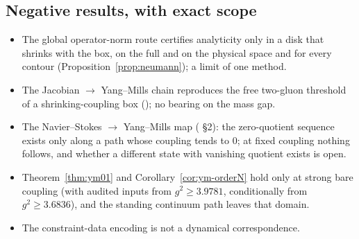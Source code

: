\subsection{Negative results, with exact scope}

\begin{itemize}
\item The global operator-norm route certifies analyticity only in a disk that shrinks with the box, on the full and on the physical space and for every contour (Proposition~\ref{prop:neumann}); a limit of one method.
\item The Jacobian $\to$ Yang--Mills chain reproduces the free two-gluon threshold of a shrinking-coupling box (); no bearing on the mass gap.
\item The Navier--Stokes $\to$ Yang--Mills map ( §2): the zero-quotient sequence exists only along a path whose coupling tends to $0$; at fixed coupling nothing follows, and whether a different state with vanishing quotient exists is open.
\item Theorem~\ref{thm:ym01} and Corollary~\ref{cor:ym-orderN} hold only at strong bare coupling (with audited inputs from $g^2\ge3.9781$, conditionally from $g^2\ge3.6836$), and the standing continuum path leaves that domain.
\item The constraint-data encoding is not a dynamical correspondence.
\end{itemize}
